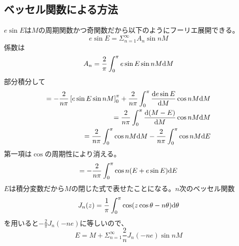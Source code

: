 	\subsection{ベッセル関数による方法}
		$e\sin E$は$M$の周期関数かつ奇関数だから以下のようにフーリエ展開できる。
			\[e\sin E = \Sigma_{n=1}^\infty A_n\sin nM\]
		係数は
			\[A_n = \frac{2}{\pi}\int_0^\pi e\sin E\sin nM \d M\]
		部分積分して
		\begin{align*}
			= - \frac{2}{n\pi}\llr{ e\sin E\sin nM }_0^\pi + \frac{2}{n\pi}\int_0^\pi \de[e\sin E]{M}\cos nM \d M\\
			= \frac{2}{n\pi}\int_0^\pi \de[(M - E)]{M}\cos nM \d M\\
			= \frac{2}{n\pi}\int_0^\pi \cos nM \d M - \frac{2}{n\pi}\int_0^\pi \cos nM \d E
		\end{align*}
		第一項は$\cos$の周期性により消える。
		\begin{align*}
			= - \frac{2}{n\pi}\int_0^\pi \cos n(E + e\sin E) \d E
		\end{align*}
		$E$は積分変数だから$M$の閉じた式で表せたことになる。$n$次のベッセル関数
			\[J_n(z) = \frac{1}{\pi}\int_0^\pi \cos(z\cos\theta - n\theta)\d \theta\]
		を用いると$-\frac{2}{\pi}J_n(-ne)$に等しいので、
			\[E = M + \Sigma_{n=1}^\infty \frac{2}{n}J_n(-ne)\sin nM\]
